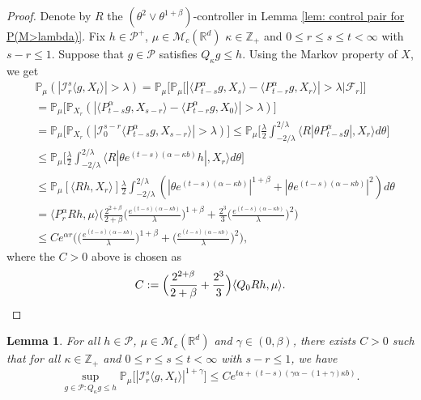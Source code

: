 \documentclass[12pt,a4paper]{amsart}
\theoremstyle{plain}
\newtheorem{lem}[thm]{Lemma}
\theoremstyle{definition}
\numberwithin{equation}{section}
\begin{document}
\begin{proof}
  Denote by $R$ the $(\theta^2\vee\theta^{1+\beta})$-controller in Lemma \ref{lem: control pair for P(M>lambda)}.
  Fix $h \in \mathcal P^+$, $\mu \in \mathcal M_c(\mathbb R^d)$ $\kappa \in \mathbb Z_+ $ and $0\leq r\leq s\leq t < \infty$ with $s-r \leq 1$.
  Suppose that $g\in \mathcal P$ satisfies $Q_\kappa g \leq h$.
  Using the Markov property of $X$, we get
\begin{align}
  & \mathbb P_{\mu}(|\mathcal I_r^s\langle g, X_t\rangle|>\lambda)
    = \mathbb P_\mu \Big[\mathbb P_\mu\big[|\langle P_{t-s}^\alpha g, X_{s}\rangle - \langle P_{t-r}^\alpha g, X_{r}\rangle|> \lambda\big| \mathscr F_r\big]\Big] \\
  & = \mathbb P_\mu \big[\mathbb P_{X_r}(|\langle P_{t-s}^\alpha g, X_{s-r}\rangle - \langle P_{t-r}^\alpha g, X_{0}\rangle|> \lambda)\big] \\
  & = \mathbb P_\mu \big[\mathbb P_{X_r}(|\mathcal I_0^{s-r}\langle P_{t-s}^\alpha g, X_{s-r}\rangle |> \lambda)\big]
  \leq \mathbb P_\mu \Big[ \frac{\lambda}{2}\int_{-2/\lambda}^{2/\lambda}\langle R|\theta P^\alpha_{t-s}g|,X_r\rangle d\theta \Big] \\
  & \leq \mathbb P_\mu \Big[ \frac{\lambda}{2}\int_{-2/\lambda}^{2/\lambda}\langle R|\theta e^{(t-s)(\alpha- \kappa b)}h|,X_r\rangle d\theta \Big] \\
  & \leq \mathbb P_\mu [ \langle Rh,X_r\rangle ] \frac{\lambda}{2}\int_{-2/\lambda}^{2/\lambda}(|\theta e^{(t-s)(\alpha- \kappa b)}|^{1+\beta} + |\theta e^{(t-s)(\alpha- \kappa b)}|^{2})d\theta
  \\ & =  \langle P_r^\alpha Rh,\mu\rangle \bigg(  \frac{2^{2+\beta}}{2+\beta}\Big(\frac{e^{(t-s)(\alpha- \kappa b)}}{\lambda}\Big)^{1+\beta} + \frac{2^{3}}{3}\Big(\frac{e^{(t-s)(\alpha- \kappa b)}}{\lambda}\Big)^2\bigg)
  \\ & \leq C e^{\alpha r} \bigg(\Big( \frac{e^{(t-s)(\alpha - \kappa b)}}{\lambda}\Big)^{1+\beta} + \Big( \frac{e^{(t-s)(\alpha - \kappa b)}}{\lambda}\Big)^{2} \bigg),
\end{align}
where the $C>0$ above is chosen as
\[
  C := \Big(\frac{2^{2+\beta}}{2+\beta} + \frac{2^{3}}{3} \Big)\langle Q_0Rh, \mu\rangle.
  \qedhere
\]
\end{proof}

\begin{lem}
  \label{lem: control of mgtrs}
  For all $h \in \mathcal P$, $\mu \in \mathcal M_c(\mathbb R^d)$ and $\gamma\in (0, \beta)$, there exists $C > 0$ such that for all $\kappa \in \mathbb Z_+$ and $0\leq r\leq s\leq t<\infty$ with $s-r \leq 1$, we have
  \[
    \sup_{g \in \mathcal P: Q_\kappa g\leq h} \mathbb P_\mu\big[|\mathcal I_r^s\langle g, X_t\rangle|^{1+\gamma}\big]
    \leq C e^{t\alpha+(t-s) (\gamma\alpha- (1+\gamma)\kappa b)}.
  \]
\end{lem}
\end{document}
